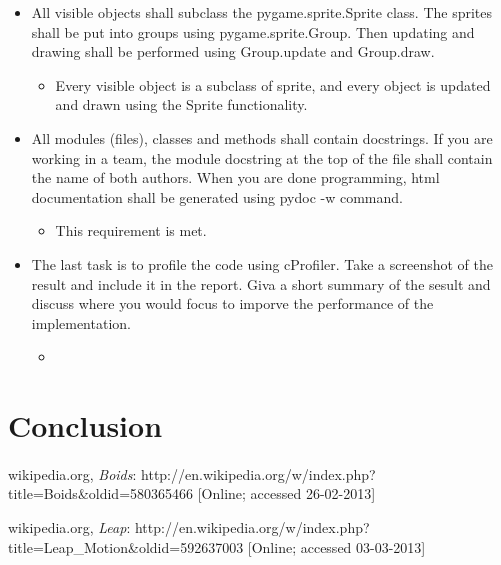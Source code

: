 \documentclass{article}
\begin{document}
\begin{itemize}
\begin{itemize}
	\end{itemize}
	\item All visible objects shall subclass the pygame.sprite.Sprite class. The sprites shall be put into groups using pygame.sprite.Group. Then updating and drawing shall be performed using Group.update and Group.draw. 
	\begin{itemize}
		\item Every visible object is a subclass of sprite, and every object is updated and drawn using the Sprite functionality.
	\end{itemize}
	\item All modules (files), classes and methods shall contain docstrings. If you are working in a team, the module docstring at the top of the file shall contain the name of both authors. When you are done programming, html documentation shall be generated using pydoc -w command.
	\begin{itemize}
		\item This requirement is met.
	\end{itemize}
	\item The last task is to profile the code using cProfiler. Take a screenshot of the result and include it in the report. Giva a short summary of the sesult and discuss where you would focus to imporve the performance of the implementation.
	\begin{itemize}
		\item 
	\end{itemize}
\end{itemize}

\section{Conclusion}
\paragraph{}



\begin{thebibliography}{9}

  wikipedia.org,
  \emph{Boids}:
  http://en.wikipedia.org/w/index.php?title=Boids\&oldid=580365466 
  [Online; accessed 26-02-2013]
  
  wikipedia.org,
  \emph{Leap}:
  http://en.wikipedia.org/w/index.php?title=Leap\_Motion\&oldid=592637003
  [Online; accessed 03-03-2013]
  

\end{thebibliography}
\end{document}
